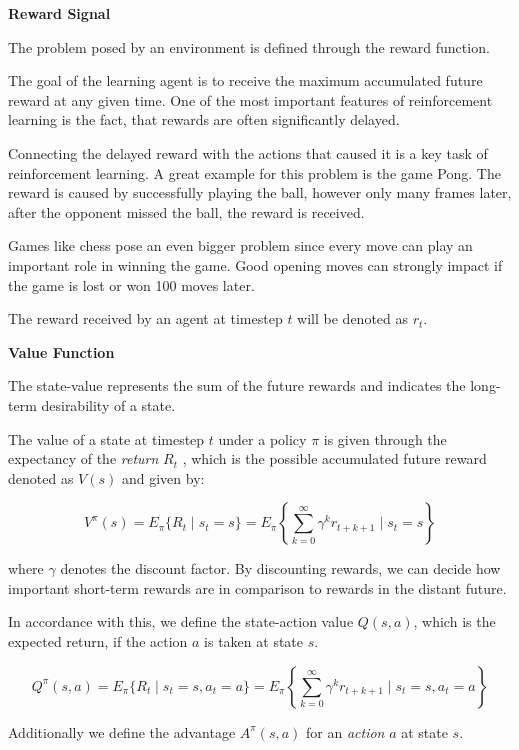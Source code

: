 \textbf{Reward Signal}

The problem posed by an environment is defined through the reward function. 

The goal of the learning agent is to receive the maximum accumulated future reward at any given time. One of the most important features of reinforcement learning is the fact, that rewards are often significantly delayed. 

Connecting the delayed reward with the actions that caused it is a key task of reinforcement learning.
A great example for this problem is the game Pong. The reward is caused by successfully playing the ball, however only many frames later, after the opponent missed the ball, the reward is received.

Games like chess pose an even bigger problem since every move can play an important role in winning the game. Good opening moves can strongly impact if the game is lost or won 100 moves later.

The reward received by an agent at timestep $t$ will be denoted as $r_t$.

\textbf{Value Function}

The state-value represents the sum of the future rewards and indicates the long-term desirability of a state.

The value of a state at timestep $t$ under a policy $\pi$ is given through the expectancy of the \textit{return} $R_t$ , which is the possible accumulated future reward denoted as $V(s)$ and given by:

\begin{equation}
{
V^\pi (s) = E_\pi \{R_t \mid s_t = s\} = E_\pi \left\{ \sum_{k=0}^\infty \gamma^k r_{t+k+1} \mid s_t = s \right\}
}
\end{equation}

where $\gamma$ denotes the discount factor. By discounting rewards, we can decide how important short-term rewards are in comparison to rewards in the distant future.

In accordance with this, we define the state-action value $Q(s,a)$, which is the expected return, if the action $a$ is taken at state $s$.

\begin{equation}
{
Q^\pi (s,a) = E_\pi \{R_t \mid s_t = s, a_t = a\} = E_\pi \left\{ \sum_{k=0}^\infty \gamma^k r_{t+k+1} \mid s_t = s, a_t = a \right\}
}
\end{equation}

Additionally we define the advantage $A^\pi(s,a)$ for an \textit{action} $a$ at state $s$.

